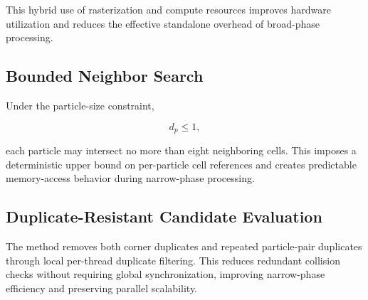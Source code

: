 This hybrid use of rasterization and compute resources improves hardware utilization and reduces the effective standalone overhead of broad-phase processing.

\subsection{Bounded Neighbor Search}

Under the particle-size constraint,

\[
d_p \leq 1,
\]

each particle may intersect no more than eight neighboring cells. This imposes a deterministic upper bound on per-particle cell references and creates predictable memory-access behavior during narrow-phase processing.

\subsection{Duplicate-Resistant Candidate Evaluation}

The method removes both corner duplicates and repeated particle-pair duplicates through local per-thread duplicate filtering. This reduces redundant collision checks without requiring global synchronization, improving narrow-phase efficiency and preserving parallel scalability.



